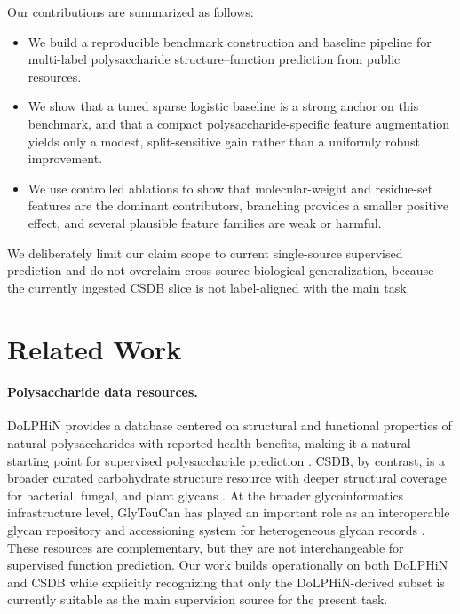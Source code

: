 \documentclass{article}
\begin{document}
Our contributions are summarized as follows:
\begin{itemize}[leftmargin=*,nosep]
\item We build a reproducible benchmark construction and baseline pipeline for multi-label polysaccharide structure--function prediction from public resources.
\item We show that a tuned sparse logistic baseline is a strong anchor on this benchmark, and that a compact polysaccharide-specific feature augmentation yields only a modest, split-sensitive gain rather than a uniformly robust improvement.
\item We use controlled ablations to show that molecular-weight and residue-set features are the dominant contributors, branching provides a smaller positive effect, and several plausible feature families are weak or harmful.
\end{itemize}

We deliberately limit our claim scope to current single-source supervised prediction and do not overclaim cross-source biological generalization, because the currently ingested CSDB slice is not label-aligned with the main task.

\section{Related Work}
\label{sec:related}

\paragraph{Polysaccharide data resources.}
DoLPHiN provides a database centered on structural and functional properties of natural polysaccharides with reported health benefits, making it a natural starting point for supervised polysaccharide prediction \cite{xin2025dolphin}. CSDB, by contrast, is a broader curated carbohydrate structure resource with deeper structural coverage for bacterial, fungal, and plant glycans \cite{toukach2022csdb}. At the broader glycoinformatics infrastructure level, GlyTouCan has played an important role as an interoperable glycan repository and accessioning system for heterogeneous glycan records \cite{tiemeyer2017glytoucan,fujita2021glytoucan3}. These resources are complementary, but they are not interchangeable for supervised function prediction. Our work builds operationally on both DoLPHiN and CSDB while explicitly recognizing that only the DoLPHiN-derived subset is currently suitable as the main supervision source for the present task.
\end{document}
